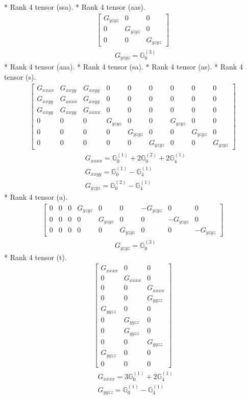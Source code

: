 \documentclass[fleqn,8pt,landscape]{jsarticle}
\begin{document}
* Rank 4 tensor (ssa).
* Rank 4 tensor (aas).
\begin{align*}
\begin{bmatrix} G_{yzyz} & 0 & 0 \\ 0 & G_{yzyz} & 0 \\ 0 & 0 & G_{yzyz} \end{bmatrix}
\end{align*}
\begin{align*}
& G_{yzyz} = \mathbb{G}_{0}^{(3)}
\end{align*}
* Rank 4 tensor (aaa).
* Rank 4 tensor (sa).
* Rank 4 tensor (as).
* Rank 4 tensor (s).
\begin{align*}
\begin{bmatrix} G_{xxxx} & G_{xxyy} & G_{xxyy} & 0 & 0 & 0 & 0 & 0 & 0 \\ G_{xxyy} & G_{xxxx} & G_{xxyy} & 0 & 0 & 0 & 0 & 0 & 0 \\ G_{xxyy} & G_{xxyy} & G_{xxxx} & 0 & 0 & 0 & 0 & 0 & 0 \\ 0 & 0 & 0 & G_{yzyz} & 0 & 0 & G_{yzyz} & 0 & 0 \\ 0 & 0 & 0 & 0 & G_{yzyz} & 0 & 0 & G_{yzyz} & 0 \\ 0 & 0 & 0 & 0 & 0 & G_{yzyz} & 0 & 0 & G_{yzyz} \end{bmatrix}
\end{align*}
\begin{align*}
& G_{xxxx} = \mathbb{G}_{0}^{(1)} + 2 \mathbb{G}_{0}^{(2)} + 2 \mathbb{G}_{4}^{(1)} \\
& G_{xxyy} = \mathbb{G}_{0}^{(1)} - \mathbb{G}_{4}^{(1)} \\
& G_{yzyz} = \mathbb{G}_{0}^{(2)} - \mathbb{G}_{4}^{(1)}
\end{align*}
* Rank 4 tensor (a).
\begin{align*}
\begin{bmatrix} 0 & 0 & 0 & G_{yzyz} & 0 & 0 & - G_{yzyz} & 0 & 0 \\ 0 & 0 & 0 & 0 & G_{yzyz} & 0 & 0 & - G_{yzyz} & 0 \\ 0 & 0 & 0 & 0 & 0 & G_{yzyz} & 0 & 0 & - G_{yzyz} \end{bmatrix}
\end{align*}
\begin{align*}
& G_{yzyz} = \mathbb{G}_{0}^{(3)}
\end{align*}
* Rank 4 tensor (t).
\begin{align*}
\begin{bmatrix} G_{xxxx} & 0 & 0 \\ 0 & G_{xxxx} & 0 \\ 0 & 0 & G_{xxxx} \\ 0 & 0 & G_{yyzz} \\ G_{yyzz} & 0 & 0 \\ 0 & G_{yyzz} & 0 \\ 0 & G_{yyzz} & 0 \\ 0 & 0 & G_{yyzz} \\ G_{yyzz} & 0 & 0 \\ 0 & 0 & 0 \end{bmatrix}
\end{align*}
\begin{align*}
& G_{xxxx} = 3 \mathbb{G}_{0}^{(1)} + 2 \mathbb{G}_{4}^{(1)} \\
& G_{yyzz} = \mathbb{G}_{0}^{(1)} - \mathbb{G}_{4}^{(1)}
\end{align*}
\end{document}
